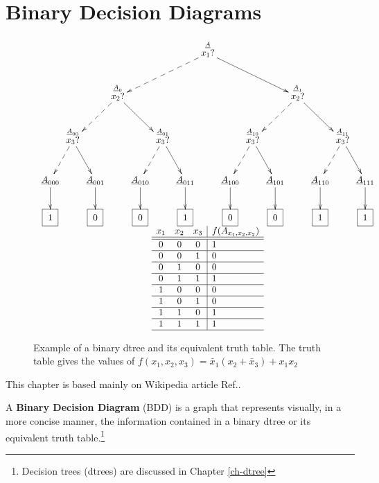 \chapter{Binary Decision Diagrams}\label{ch-binarydd}

\begin{figure}[h!]
$$
\begin{array}{c}
\xymatrix@C=.1pc{
&&&&&&&\stackrel{\rvA}{x_1?}\ar@{-->}[dllll]
\ar[drrrr]
\\
&&&\stackrel{\rvA_0}{x_2?}\ar@{-->}[dll]\ar[drr]
&&&&&&&&\stackrel{\rvA_1} {x_2?}\ar@{-->}[dll]\ar[drr]
\\
&\stackrel{\rvA_{00}}{ x_3?}\ar@{-->}[dl]\ar[dr]
&&&&\stackrel{\rvA_{01}} {x_3?}\ar@{-->}[dl]\ar[dr]
&&&&\stackrel{\rvA_{10}}{ x_3?}\ar@{-->}[dl]\ar[dr]
&&&&\stackrel{\rvA_{11}}{x_3?}\ar@{-->}[dl]\ar[dr]
\\
\rvA_{000}\ar[d]
&&\rvA_{001}\ar[d]
&&\rvA_{010}\ar[d]
&&\rvA_{011}\ar[d]
&&\rvA_{100}\ar[d]
&&\rvA_{101}\ar[d]
&&\rvA_{110}\ar[d]
&&\rvA_{111}\ar[d]
\\
\Rect{1}
&&\Rect{0}
&&\Rect{0}
&&\Rect{1}
&&\Rect{0}
&&\Rect{0}
&&\Rect{1}
&&\Rect{1}
}
\\
\begin{array}{ccc|l}
x_1&x_2&x_3&f(A_{x_1,x_2,x_2})
\\ \hline\hline
0
&0
&0
&1
\\ \hline
0
&0
&1
&0
\\ \hline
0
&1
&0
&0
\\ \hline
0
&1
&1
&1
\\ \hline
1
&0
&0
&0
\\ \hline
1
&0
&1
&0
\\ \hline
1
&1
&0
&1
\\ \hline
1
&1
&1
&1
\\ \hline
\end{array}
\end{array}
$$
\caption{Example of a binary dtree and its 
equivalent truth table.
The truth table gives the values of $
f(x_1, x_2,x_3)=
\bar{x}_1(x_2+\bar{x}_3)  + x_1 x_2 $ }
\label{fig-bdd-tree}
\end{figure}

This chapter is based
mainly on Wikipedia article Ref.\cite{wiki-bdd}.

A {\bf Binary Decision Diagram} (BDD) is a 
graph that represents 
visually, in a more concise manner,
the information contained in
a binary dtree  or
its equivalent truth table.\footnote{Decision trees (dtrees) are discussed
in Chapter \ref{ch-dtree}}

